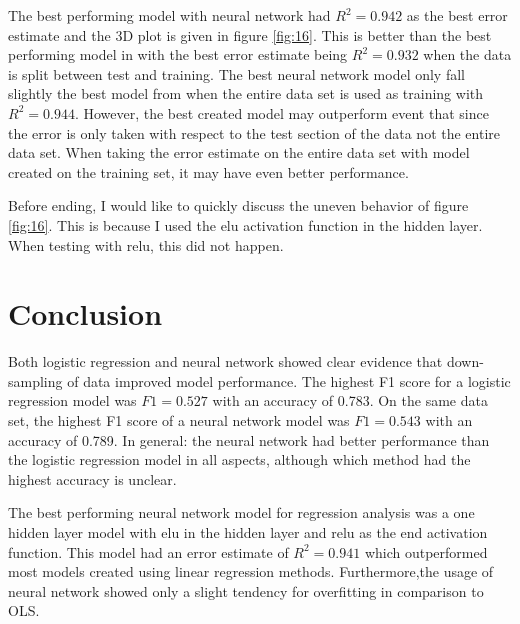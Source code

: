 \documentclass[uio,jmp,amsmath,amssymb,reprint,nofootinbib]{revtex4-1}
\numberwithin{equation}{section}
\begin{document}
The best performing model with neural network had \(R^2 = 0.942\) as the best error estimate and the 3D plot is given in figure \ref{fig:16}. This is better than the best performing model in \cite{Jon_P1} with the best error estimate being \(R^2 = 0.932\) when the data is split between test and training. The best neural network model only fall slightly the best model from \cite{Jon_P1} when the entire data set is used as training with \(R^2 = 0.944\). However, the best created model may outperform event that since the error is only taken with respect to the test section of the data not the entire data set. When taking the error estimate on the entire data set with model created on the training set, it may have even better performance.

Before ending, I would like to quickly discuss the uneven behavior of figure \ref{fig:16}. This is because I used the elu activation function in the hidden layer. When testing with relu, this did not happen.


\section{Conclusion}\label{sec:Conclusion}

Both logistic regression and neural network showed clear evidence that down-sampling of data improved model performance. The highest F1 score for a logistic regression model was \(F1=0.527\) with an accuracy of 0.783. On the same data set, the highest F1 score of a neural network model was \(F1 = 0.543\) with an accuracy of 0.789. In general: the neural network had better performance than the logistic regression model in all aspects, although which method had the highest accuracy is unclear.

The best performing neural network model for regression analysis was a one hidden layer model with elu in the hidden layer and relu as the end activation function. This model had an error estimate of \(R^2 = 0.941\) which outperformed most models created using linear regression methods. Furthermore,the usage of neural network showed only a slight tendency for overfitting in comparison to OLS.

\newpage
\appendix
\end{document}
